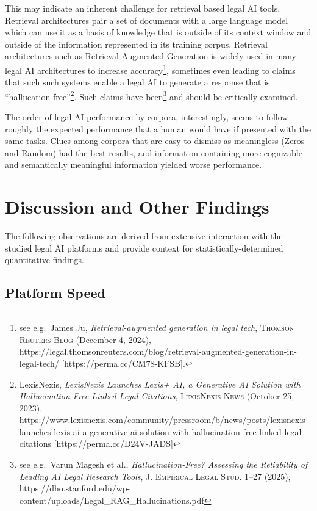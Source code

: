 \documentclass[
]{article}
\begin{document}
This may indicate an inherent challenge for retrieval based legal AI
tools. Retrieval architectures pair a set of documents with a large
language model which can use it as a basis of knowledge that is outside
of its context window and outside of the information represented in its
training corpus. Retrieval architectures such as Retrieval Augmented
Generation is widely used in many legal AI architectures to increase
accuracy\footnote{see e.g.~James Ju, \emph{Retrieval-augmented
  generation in legal tech}, \textsc{Thomson Reuters Blog} (December 4,
  2024),
  https://legal.thomsonreuters.com/blog/retrieval-augmented-generation-in-legal-tech/
  {[}https://perma.cc/CM78-KFSB{]}.}, sometimes even leading to claims
that such such systems enable a legal AI to generate a response that is
``hallucation free''\footnote{LexisNexis, \emph{LexisNexis Launches
  Lexis+ AI, a Generative AI Solution with Hallucination-Free Linked
  Legal Citations}, \textsc{LexisNexis News} (October 25, 2023),
  https://www.lexisnexis.com/community/pressroom/b/news/posts/lexisnexis-launches-lexis-ai-a-generative-ai-solution-with-hallucination-free-linked-legal-citations
  {[}https://perma.cc/D24V-JADS{]}}. Such claims have been\footnote{see
  e.g.~Varun Magesh et al., \emph{Hallucination-Free? Assessing the
  Reliability of Leading AI Legal Research Tools}, \textsc{J. Empirical
  Legal Stud.} 1--27 (2025),
  https://dho.stanford.edu/wp-content/uploads/Legal\_RAG\_Hallucinations.pdf}
and should be critically examined.

The order of legal AI performance by corpora, interestingly, seems to
follow roughly the expected performance that a human would have if
presented with the same tasks. Clues among corpora that are easy to
dismiss as meaningless (Zeros and Random) had the best results, and
information containing more cognizable and semantically meaningful
information yielded worse performance.

\section{Discussion and Other
Findings}\label{discussion-and-other-findings}

The following observations are derived from extensive interaction with
the studied legal AI platforms and provide context for
statistically-determined quantitative findings.

\subsection{Platform Speed}\label{platform-speed}
\end{document}
